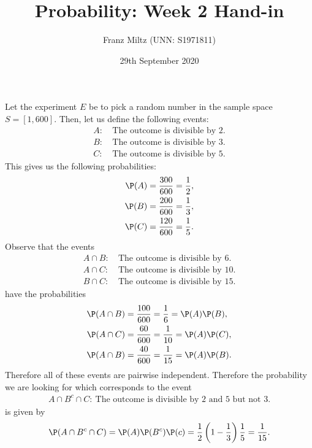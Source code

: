 \documentclass{article}
\begin{document}
\title{Probability: Week 2 Hand-in}
\author{Franz Miltz (UNN: S1971811)}
\date{29th September 2020}
\maketitle
\noindent Let the experiment $E$ be to pick a random number in the sample space
$S=[1,600]$. Then, let us define the following events:
\begin{align*}
  A:\:&\text{The outcome is divisible by 2.}\\
  B:\:&\text{The outcome is divisible by 3.}\\
  C:\:&\text{The outcome is divisible by 5.}
\end{align*}
This gives us the following probabilities:
\begin{align*}
  \P(A)=\frac{300}{600}=\frac{1}{2},\\
  \P(B)=\frac{200}{600}=\frac{1}{3},\\
  \P(C)=\frac{120}{600}=\frac{1}{5}.
\end{align*}
Observe that the events
\begin{align*}
  A\cap B:\:&\text{The outcome is divisible by 6.}\\
  A\cap C:\:&\text{The outcome is divisible by 10.}\\
  B\cap C:\:&\text{The outcome is divisible by 15.}
\end{align*}
have the probabilities
\begin{align*}
  \P(A\cap B)&=\frac{100}{600}=\frac{1}{6}=\P(A)\P(B),\\
  \P(A\cap C)&=\frac{60}{600}=\frac{1}{10}=\P(A)\P(C),\\
  \P(A\cap B)&=\frac{40}{600}=\frac{1}{15}=\P(A)\P(B).
\end{align*}
Therefore all of these events are pairwise independent. Therefore the
probability we are looking for which corresponds to the event
\begin{align*}
  A\cap B^c \cap C:\:\text{The outcome is divisible by 2 and 5 but not 3.}
\end{align*}
is given by
\begin{align*}
  \P(A\cap B^c\cap C)= \P(A)\P(B^c)\P(c) = \frac{1}{2}\left(1-\frac{1}{3}\right)\frac{1}{5}=\frac{1}{15}.
\end{align*}
\end{document}

